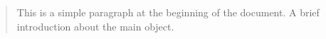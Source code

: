 \documentclass{article}
\begin{document}
	\begin{abstract}
		This is a simple paragraph at the beginning of the document. A brief introduction about the main object.
	\end{abstract}
\end{document}
